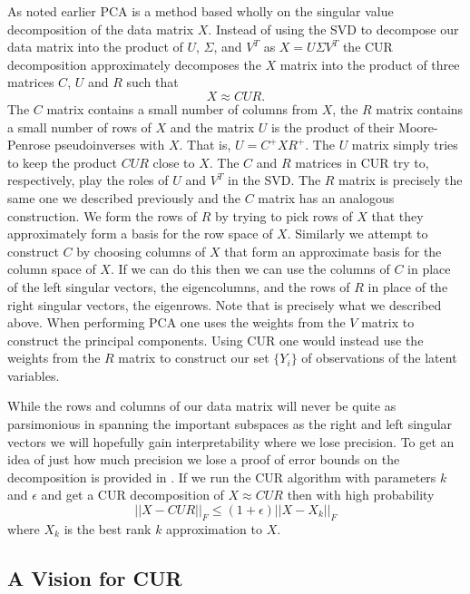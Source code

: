 \documentclass{book}
\begin{document}
As noted earlier PCA is a method based wholly on the singular value decomposition of the data matrix $X$. Instead of using the SVD to decompose our data matrix into the product of $U$, $\Sigma$, and $V^T$ as $X=U\Sigma V^T$ the CUR decomposition approximately decomposes the $X$ matrix into the product of three matrices $C$, $U$ and $R$ such that
$$
X\approx CUR.
$$ 
The $C$ matrix contains a small number of columns from $X$, the $R$ matrix contains a small number of rows of $X$ and the matrix $U$ is the product of their Moore-Penrose pseudoinverses with $X$. That is, $U=C^+XR^+$. The $U$ matrix simply tries to keep the product $CUR$ close to $X$. The $C$ and $R$ matrices in CUR try to, respectively,  play the roles of $U$ and $V^T$ in the SVD. The $R$ matrix is precisely the same one we described previously and the $C$ matrix has an analogous construction. We form the rows of $R$ by trying to pick rows of $X$ that they approximately form a basis for the row space of $X$. Similarly we attempt to construct $C$ by choosing columns of $X$ that form an approximate basis for the column space of $X$. If we can do this then we can use the columns of $C$ in place of the left singular vectors, the eigencolumns, and the rows of $R$ in place of the right singular vectors, the eigenrows. Note that is precisely what we described above. When performing PCA one uses the weights from the $V$ matrix to construct the principal components. Using CUR one would instead use the weights from the $R$ matrix to construct our set $\{Y_i\}$ of observations of the latent variables. 

While the rows and columns of our data matrix will never be quite as parsimonious in spanning the important subspaces as the right and left singular vectors we will hopefully gain interpretability where we lose precision. To get an idea of just how much precision we lose a proof of error bounds on the decomposition is provided in \cite{pnas}. If we run the CUR algorithm with parameters $k$ and $\epsilon$ and get a CUR decomposition of $X\approx CUR$ then with high probability
$$
||X-CUR||_F\leq (1+\epsilon)||X-X_k||_F
$$
where $X_k$ is the best rank $k$ approximation to $X$.

\subsection{A Vision for CUR}
\end{document}
